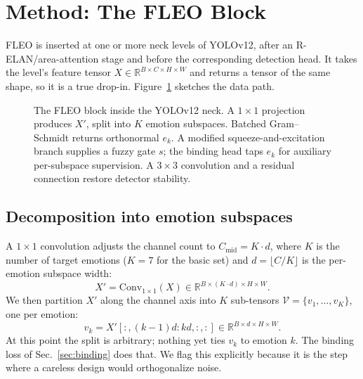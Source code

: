 \documentclass[journal]{IEEEtran}
\begin{document}
\section{Method: The FLEO Block}\label{sec:method}
FLEO is inserted at one or more neck levels of YOLOv12, after an
R-ELAN/area-attention stage and before the corresponding detection head. It
takes the level's feature tensor $X \in \mathbb{R}^{B\times C\times H\times W}$
and returns a tensor of the same shape, so it is a true drop-in.
Figure~\ref{fig:block} sketches the data path.

\begin{figure}[t]
\centering
{}
\caption{The FLEO block inside the YOLOv12 neck. A $1\times1$ projection
produces $X'$, split into $K$ emotion subspaces. Batched Gram--Schmidt returns
orthonormal $e_k$. A modified squeeze-and-excitation branch supplies a fuzzy
gate $s$; the binding head taps $e_k$ for auxiliary per-subspace supervision.
A $3\times3$ convolution and a residual connection restore detector stability.}
\label{fig:block}
\end{figure}

\subsection{Decomposition into emotion subspaces}
A $1\times1$ convolution adjusts the channel count to $C_\text{mid}=K\cdot d$,
where $K$ is the number of target emotions ($K=7$ for the basic set) and
$d=\lfloor C/K\rfloor$ is the per-emotion subspace width:
\begin{equation}
X' = \text{Conv}_{1\times1}(X)\in\mathbb{R}^{B\times(K\cdot d)\times H\times W}.
\end{equation}
We then partition $X'$ along the channel axis into $K$ sub-tensors
$\mathcal{V}=\{v_1,\dots,v_K\}$, one per emotion:
\begin{equation}
v_k = X'[:,(k{-}1)d:kd,:,:]\in\mathbb{R}^{B\times d\times H\times W}.
\end{equation}
At this point the split is arbitrary; nothing yet ties $v_k$ to emotion $k$.
The binding loss of Sec.~\ref{sec:binding} does that. We flag this explicitly
because it is the step where a careless design would orthogonalize noise.
\end{document}
